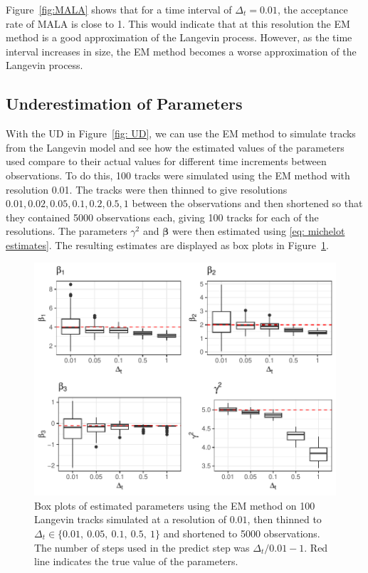 Figure~\ref{fig:MALA} shows that for a time interval of $\Delta_t =0.01$, the acceptance rate of MALA is close to 1. This would indicate that at this resolution the EM method is a good approximation of the Langevin process. However, as the time interval increases in size, the EM method becomes a worse approximation of the Langevin process.


\subsection{Underestimation of Parameters}

With the UD in Figure~\ref{fig: UD}, we can use the EM method to simulate tracks from the Langevin model and see how the estimated values of the parameters used compare to their actual values for different time increments between observations. To do this, 100 tracks were simulated using the EM method with resolution 0.01. The tracks were then thinned to give resolutions $0.01, 0.02, 0.05, 0.1, 0.2, 0.5, 1$ between the observations and then shortened so that they contained 5000 observations each, giving 100 tracks for each of the resolutions. The parameters $\gamma^2$ and $\bm \beta$ were then estimated using \eqref{eq: michelot estimates}. The resulting estimates are displayed as box plots in Figure~\ref{fig:EM_thin_boxplot}.


\begin{figure}[H]
    \centering
    \includegraphics[width=\linewidth]{Images/background/varying dt EM boxplot.pdf}
    \caption[Euler-Mauryama estimates]{Box plots of estimated parameters using the EM method on 100 Langevin tracks simulated at a resolution of $0.01$, then thinned to $\Delta_t \in \{0.01, \ 0.05, \ 0.1, \ 0.5, \ 1\}$ and shortened to 5000 observations. The number of steps used in the predict step was $\Delta_t/0.01-1$. Red line indicates the true value of the parameters.}
    \label{fig:EM_thin_boxplot}
\end{figure}


